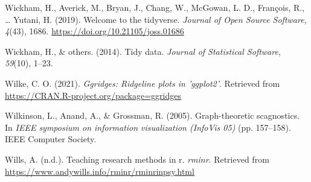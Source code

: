 \documentclass[
  english,
  doc,floatsintext]{apa6}
\newlength{\cslhangindent}
\newenvironment{CSLReferences}[2] %
 {%
  \setlength{\parindent}{0pt}
  \ifodd #1 \everypar{\setlength{\hangindent}{\cslhangindent}}\ignorespaces\fi
  \ifnum #2 > 0
  \setlength{\parskip}{#2\baselineskip}
  \fi
 }%
 {}
\begin{document}
\begin{CSLReferences}{1}{0}
\leavevmode{}%
Wickham, H., Averick, M., Bryan, J., Chang, W., McGowan, L. D., François, R., \ldots{} Yutani, H. (2019). Welcome to the {tidyverse}. \emph{Journal of Open Source Software}, \emph{4}(43), 1686. \url{https://doi.org/10.21105/joss.01686}

\leavevmode{}%
Wickham, H., \& others. (2014). Tidy data. \emph{Journal of Statistical Software}, \emph{59}(10), 1--23.

\leavevmode{}%
Wilke, C. O. (2021). \emph{Ggridges: Ridgeline plots in 'ggplot2'}. Retrieved from \url{https://CRAN.R-project.org/package=ggridges}

\leavevmode{}%
Wilkinson, L., Anand, A., \& Grossman, R. (2005). Graph-theoretic scagnostics. In \emph{IEEE symposium on information visualization (InfoVis 05)} (pp. 157--158). IEEE Computer Society.

\leavevmode{}%
Wills, A. (n.d.). Teaching research methods in r. \emph{rminr}. Retrieved from \url{https://www.andywills.info/rminr/rminrinpsy.html}

\end{CSLReferences}

\endgroup
\end{document}
